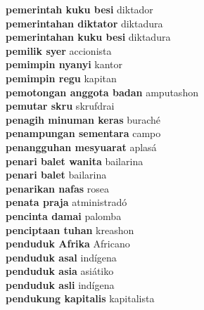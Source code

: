\textbf{ pemerintah kuku besi  } diktador \\
\textbf{ pemerintahan diktator  } diktadura \\
\textbf{ pemerintahan kuku besi  } diktadura \\
\textbf{ pemilik syer  } accionista \\
\textbf{ pemimpin nyanyi  } kantor \\
\textbf{ pemimpin regu  } kapitan \\
\textbf{ pemotongan anggota badan  } amputashon \\
\textbf{ pemutar skru  } skrufdrai \\
\textbf{ penagih minuman keras  } buraché \\
\textbf{ penampungan sementara  } campo \\
\textbf{ penangguhan mesyuarat  } aplasá \\
\textbf{ penari balet wanita  } bailarina \\
\textbf{ penari balet  } bailarina \\
\textbf{ penarikan nafas  } rosea \\
\textbf{ penata praja  } atministradó \\
\textbf{ pencinta damai  } palomba \\
\textbf{ penciptaan tuhan  } kreashon \\
\textbf{ penduduk Afrika  } Africano \\
\textbf{ penduduk asal  } indígena \\
\textbf{ penduduk asia  } asiátiko \\
\textbf{ penduduk asli  } indígena \\
\textbf{ pendukung kapitalis  } kapitalista \\
